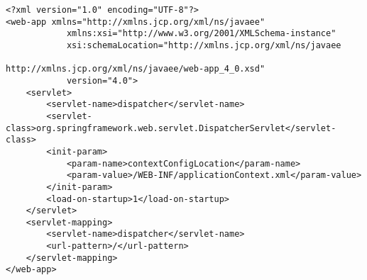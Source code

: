 \documentclass{article}
\begin{document}
\begin{lstlisting}[frame=single, basicstyle=\ttfamily, breaklines=true, breakatwhitespace=true, postbreak=\mbox{\textcolor{red}{$\hookrightarrow$}\space}]
<?xml version="1.0" encoding="UTF-8"?>
<web-app xmlns="http://xmlns.jcp.org/xml/ns/javaee"
            xmlns:xsi="http://www.w3.org/2001/XMLSchema-instance"
            xsi:schemaLocation="http://xmlns.jcp.org/xml/ns/javaee
                                http://xmlns.jcp.org/xml/ns/javaee/web-app_4_0.xsd"
            version="4.0">
    <servlet>
        <servlet-name>dispatcher</servlet-name>
        <servlet-class>org.springframework.web.servlet.DispatcherServlet</servlet-class>
        <init-param>
            <param-name>contextConfigLocation</param-name>
            <param-value>/WEB-INF/applicationContext.xml</param-value>
        </init-param>
        <load-on-startup>1</load-on-startup>
    </servlet>
    <servlet-mapping>
        <servlet-name>dispatcher</servlet-name>
        <url-pattern>/</url-pattern>
    </servlet-mapping>
</web-app>
\end{lstlisting}
\end{document}
